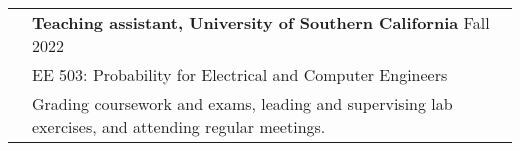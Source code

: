 \documentclass[letterpaper, 11pt]{article}
\begin{document}
\begin{longtable}{p{1.3in}p{4.8in}}

{\color{black}{Teaching experience}} 
& \textbf{Teaching assistant, University of Southern California} \hfill Fall 2022 \\
& EE 503: Probability for Electrical and Computer Engineers \\
& Grading coursework and exams, leading and supervising lab exercises, and attending regular meetings. \\













\end{longtable}
\end{document}
